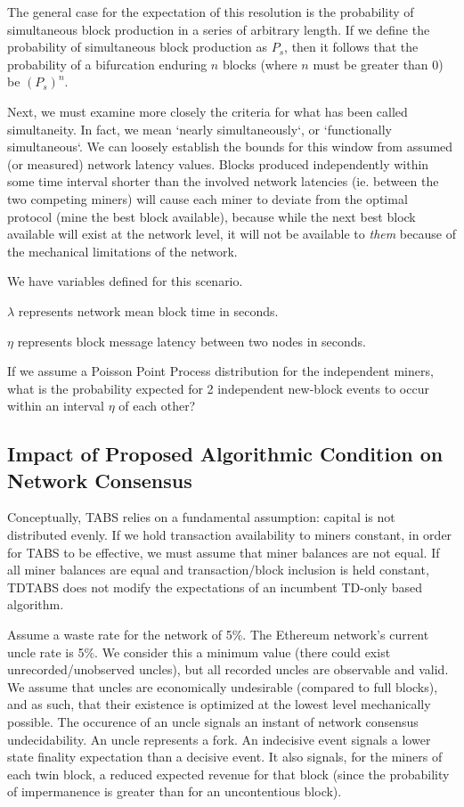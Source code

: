 \documentclass[11pt]{article}
\theoremstyle{plain}
\begin{document}
{The general case for the expectation of this resolution is the probability of
simultaneous block production in a series of arbitrary length.
If we define the probability of simultaneous block production as $P_s$,
then it follows that the probability of a bifurcation enduring $n$ blocks
(where $n$ must be greater than 0) be $(P_{s})^{n}$.

Next, we must examine more closely the criteria for what has been called
simultaneity.
In fact, we mean `nearly simultaneously`, or `functionally simultaneous`.
We can loosely establish the bounds for this window from assumed (or measured)
network latency values.
Blocks produced independently within some time interval shorter than the
involved network latencies (ie. between the two competing miners)
will cause each miner to deviate from the optimal protocol (mine the best block
available), because while the next best block available will exist at the
network level,
it will not be available to \textit{them} because of the mechanical limitations
of the network.

We have variables defined for this scenario.

$\lambda$ represents network mean block time in seconds.

$\eta$ represents block message latency between two nodes in seconds.

If we assume a Poisson Point Process distribution for the independent miners,
what is the probability expected for 2 independent new-block events to occur
within an interval $\eta$ of each other?


\subsection{\normalsize{Impact of Proposed Algorithmic Condition on Network
Consensus}}

Conceptually, TABS relies on a fundamental assumption: capital is not
distributed evenly.
If we hold transaction availability to miners constant, in order for TABS to be
effective, we must assume that miner balances are not equal.
If all miner balances are equal and transaction/block inclusion is held
constant, TDTABS does not modify the expectations of an incumbent TD-only based
algorithm.

Assume a waste rate for the network of 5\%.
The Ethereum network's current uncle rate is 5\%. We consider this a minimum
value (there could exist unrecorded/unobserved uncles), but all recorded uncles
are observable and valid.
We assume that uncles are economically undesirable (compared to full blocks),
and as such, that their existence is optimized at the lowest level mechanically
possible.
The occurence of an uncle signals an instant of network consensus
undecidability.
An uncle represents a fork.
An indecisive event signals a lower state finality expectation than a decisive
event.
It also signals, for the miners of each twin block, a reduced expected revenue
for that block (since the probability of impermanence is greater than for an
uncontentious block).

}
\end{document}
